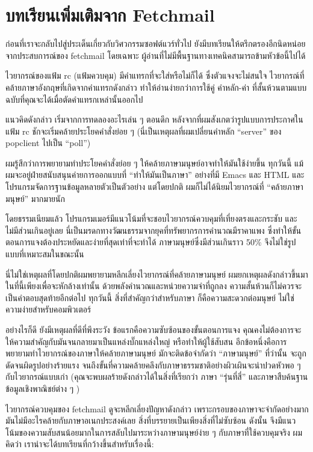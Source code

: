 \chapter{บทเรียนเพิ่มเติมจาก Fetchmail}

ก่อนที่เราจะกลับไปสู่ประเด็นเกี่ยวกับวิศวกรรมซอฟต์แวร์ทั่วไป
ยังมีบทเรียนให้ตรึกตรองอีกนิดหน่อยจากประสบการณ์ของ fetchmail โดยเฉพาะ
ผู้อ่านที่ไม่มีพื้นฐานทางเทคนิคสามารถข้ามหัวข้อนี้ไปได้

ไวยากรณ์ของแฟ้ม rc (แฟ้มควบคุม) มีคำแทรกที่จะใส่หรือไม่ก็ได้
ซึ่งตัวแจงจะไม่สนใจ ไวยากรณ์ที่คล้ายภาษาอังกฤษที่เกิดจากคำแทรกดังกล่าว
ทำให้อ่านง่ายกว่าการใช้คู่ คำหลัก-ค่า
ที่สั้นห้วนตามแบบฉบับที่คุณจะได้เมื่อตัดคำแทรกเหล่านั้นออกไป

แนวคิดดังกล่าว เริ่มจากการทดลองอะไรเล่น ๆ  ตอนดึก
หลังจากที่ผมสังเกตว่ารูปแบบการประกาศในแฟ้ม rc
ชักจะเริ่มคล้ายประโยคคำสั่งย่อย ๆ  (นี่เป็นเหตุผลที่ผมเปลี่ยนคำหลัก
``server'' ของ popclient ไปเป็น ``poll'')

ผมรู้สึกว่าการพยายามทำประโยคคำสั่งย่อย ๆ
ให้คล้ายภาษามนุษย์อาจทำให้มันใช้ง่ายขึ้น ทุกวันนี้
แม้ผมจะอยู่ฝ่ายสนับสนุนค่ายการออกแบบที่ ``ทำให้มันเป็นภาษา'' อย่างที่มี
Emacs และ HTML และโปรแกรมจัดการฐานข้อมูลหลายตัวเป็นตัวอย่าง แต่โดยปกติ
ผมก็ไม่ได้นิยมไวยากรณ์ที่ ``คล้ายภาษามนุษย์'' มากมายนัก

โดยธรรมเนียมแล้ว
โปรแกรมเมอร์มีแนวโน้มที่จะชอบไวยากรณ์ควบคุมที่เที่ยงตรงและกระชับ
และไม่มีส่วนเกินอยู่เลย
นี่เป็นมรดกทางวัฒนธรรมจากยุคที่ทรัพยากรการคำนวณมีราคาแพง
ซึ่งทำให้ขั้นตอนการแจงต้องประหยัดและง่ายที่สุดเท่าที่จะทำได้
ภาษามนุษย์ซึ่งมีส่วนเกินราว 50\% จึงไม่ใช่รูปแบบที่เหมาะสมในขณะนั้น

นี่ไม่ใช่เหตุผลที่โดยปกติผมพยายามหลีกเลี่ยงไวยากรณ์ที่คล้ายภาษามนุษย์
ผมยกเหตุผลดังกล่าวขึ้นมาในที่นี้เพียงเพื่อจะหักล้างเท่านั้น
ด้วยพลังคำนวณและหน่วยความจำที่ถูกลง
ความสั้นห้วนก็ไม่ควรจะเป็นคำตอบสุดท้ายอีกต่อไป ทุกวันนี้
สิ่งที่สำคัญกว่าสำหรับภาษา ก็คือความสะดวกต่อมนุษย์
ไม่ใช่ความง่ายสำหรับคอมพิวเตอร์

อย่างไรก็ดี ยังมีเหตุผลที่ดีที่พึงระวัง
ข้อแรกคือความซับซ้อนของขั้นตอนการแจง
คุณคงไม่ต้องการจะให้ความสำคัญกับมันจนกลายมาเป็นแหล่งบั๊กแหล่งใหญ่
หรือทำให้ผู้ใช้สับสน
อีกข้อหนึ่งคือการพยายามทำไวยากรณ์ของภาษาให้คล้ายภาษามนุษย์
มักจะติดข้อจำกัดว่า ``ภาษามนุษย์'' ที่ว่านั้น
จะถูกดัดจนผิดรูปอย่างร้ายแรง
จนถึงขั้นที่ความคล้ายคลึงกับภาษาธรรมชาติอย่างผิวเผินจะน่าปวดหัวพอ ๆ
กับไวยากรณ์แบบเก่า (คุณจะพบผลร้ายดังกล่าวได้ในสิ่งที่เรียกว่า ภาษา
``รุ่นที่สี่'' และภาษาสืบค้นฐานข้อมูลเชิงพาณิชย์ต่าง ๆ )

ไวยากรณ์ควบคุมของ fetchmail ดูจะหลีกเลี่ยงปัญหาดังกล่าว
เพราะกรอบของภาษาจะจำกัดอย่างมาก มันไม่มีอะไรคล้ายกับภาษาอเนกประสงค์เลย
สิ่งที่บรรยายเป็นเพียงสิ่งที่ไม่ซับซ้อน ดังนั้น
จึงมีแนวโน้มของความสับสนน้อยมากในการสลับไปมาระหว่างภาษามนุษย์ง่าย ๆ
กับภาษาที่ใช้ควบคุมจริง ผมคิดว่า
เราน่าจะได้บทเรียนที่กว้างขึ้นสำหรับเรื่องนี้:

